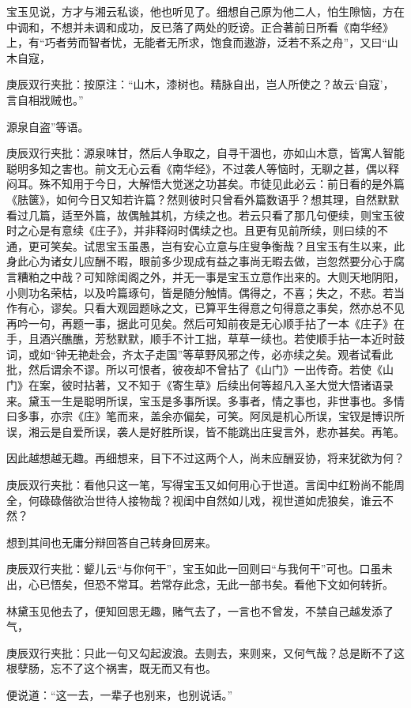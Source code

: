 \begin{parag}
    宝玉见说，方才与湘云私谈，他也听见了。细想自己原为他二人，怕生隙恼，方在中调和，不想并未调和成功，反已落了两处的贬谤。正合著前日所看《南华经》上，有“巧者劳而智者忧，无能者无所求，饱食而遨游，泛若不系之舟”，又曰“山木自寇，\begin{note}庚辰双行夹批：按原注：“山木，漆树也。精脉自出，岂人所使之？故云‘自寇’，言自相戕贼也。”\end{note}源泉自盗”等语。\begin{note}庚辰双行夹批：源泉味甘，然后人争取之，自寻干涸也，亦如山木意，皆寓人智能聪明多知之害也。前文无心云看《南华经》，不过袭人等恼时，无聊之甚，偶以释闷耳。殊不知用于今日，大解悟大觉迷之功甚矣。市徒见此必云：前日看的是外篇《胠箧》，如何今日又知若许篇？然则彼时只曾看外篇数语乎？想其理，自然默默看过几篇，适至外篇，故偶触其机，方续之也。若云只看了那几句便续，则宝玉彼时之心是有意续《庄子》，并非释闷时偶续之也。且更有见前所续，则曰续的不通，更可笑矣。试思宝玉虽愚，岂有安心立意与庄叟争衡哉？且宝玉有生以来，此身此心为诸女儿应酬不暇，眼前多少现成有益之事尚无暇去做，岂忽然要分心于腐言糟粕之中哉？可知除闺阁之外，并无一事是宝玉立意作出来的。大则天地阴阳，小则功名荣枯，以及吟篇琢句，皆是随分触情。偶得之，不喜；失之，不悲。若当作有心，谬矣。只看大观园题咏之文，已算平生得意之句得意之事矣，然亦总不见再吟一句，再题一事，据此可见矣。然后可知前夜是无心顺手拈了一本《庄子》在手，且酒兴醮醮，芳愁默默，顺手不计工拙，草草一续也。若使顺手拈一本近时鼓词，或如“钟无艳赴会，齐太子走国”等草野风邪之传，必亦续之矣。观者试看此批，然后谓余不谬。所以可恨者，彼夜却不曾拈了《山门》一出传奇。若使《山门》在案，彼时拈著，又不知于《寄生草》后续出何等超凡入圣大觉大悟诸语录来。黛玉一生是聪明所误，宝玉是多事所误。多事者，情之事也，非世事也。多情曰多事，亦宗《庄》笔而来，盖余亦偏矣，可笑。阿凤是机心所误，宝钗是博识所误，湘云是自爱所误，袭人是好胜所误，皆不能跳出庄叟言外，悲亦甚矣。再笔。\end{note}因此越想越无趣。再细想来，目下不过这两个人，尚未应酬妥协，将来犹欲为何？\begin{note}庚辰双行夹批：看他只这一笔，写得宝玉又如何用心于世道。言闺中红粉尚不能周全，何碌碌偕欲治世待人接物哉？视闺中自然如儿戏，视世道如虎狼矣，谁云不然？\end{note}想到其间也无庸分辩回答自己转身回房来。\begin{note}庚辰双行夹批：颦儿云“与你何干”，宝玉如此一回则曰“与我何干”可也。口虽未出，心已悟矣，但恐不常耳。若常存此念，无此一部书矣。看他下文如何转折。\end{note}林黛玉见他去了，便知回思无趣，赌气去了，一言也不曾发，不禁自己越发添了气，\begin{note}庚辰双行夹批：只此一句又勾起波浪。去则去，来则来，又何气哉？总是断不了这根孽肠，忘不了这个祸害，既无而又有也。\end{note}便说道：“这一去，一辈子也别来，也别说话。”
\end{parag}


